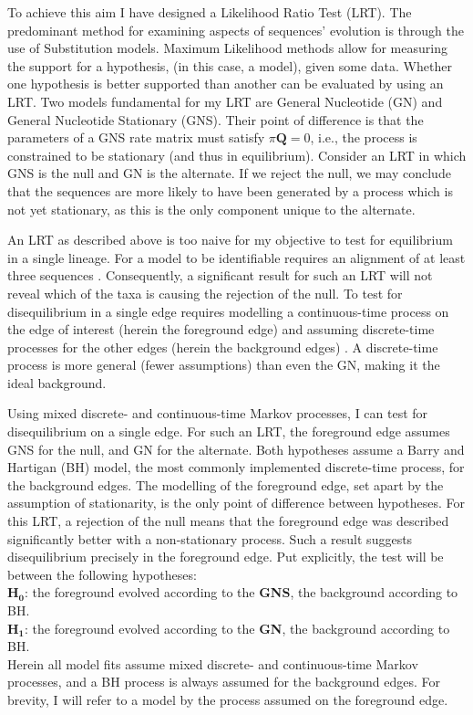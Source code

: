 To achieve this aim I have designed a Likelihood Ratio Test (LRT). The predominant method for examining aspects of sequences' evolution is through the use of \glspl{Substitution model}. \Gls{Maximum Likelihood} methods allow for measuring the support for a hypothesis, (in this case, a \gls{model}), given some data. Whether one hypothesis is better supported than another can be evaluated by using an LRT. Two models fundamental for my LRT are General Nucleotide (GN) and General Nucleotide Stationary (GNS). Their point of difference is that the parameters of a GNS rate matrix must satisfy $\pi\mathbf{Q}=0$, i.e., the process is constrained to be stationary (and thus in equilibrium). Consider an LRT in which GNS is the null and GN is the alternate. If we reject the null, we may conclude that the sequences are more likely to have been generated by a process which is not yet stationary, as this is the only component unique to the alternate.

An LRT as described above is too naive for my objective to test for equilibrium in a single lineage. For a model to be \gls{identifiable} requires an alignment of at least three sequences \cite{Chang1996FullConsistency}. Consequently, a significant result for such an LRT will not reveal which of the taxa is causing the rejection of the null. To test for disequilibrium in a single \gls{edge} requires  modelling a continuous-time process on the edge of interest (herein the foreground edge) and assuming discrete-time processes for the other edges (herein the background edges) \cite{Verbyla2013TheSubstitution}. A discrete-time process is more general (fewer assumptions) than even the GN, making it the ideal background. 

Using mixed discrete- and continuous-time Markov processes, I can test for disequilibrium on a single edge. For such an LRT, the foreground edge assumes GNS for the null, and GN for the alternate. Both hypotheses assume a Barry and Hartigan (BH) model, the most commonly implemented discrete-time process, for the background edges. The modelling of the foreground edge, set apart by the assumption of stationarity, is the only point of difference between hypotheses. For this LRT, a rejection of the null means that the foreground edge was described significantly better with a non-stationary process. Such a result suggests disequilibrium precisely in the foreground edge. Put explicitly, the test will be between the following hypotheses:\\ $\mathbf{H_0}$: the foreground evolved according to the \textbf{GNS}, the background according to BH. \\ $\mathbf{H_1}$: the foreground evolved according to the \textbf{GN}, the background according to BH.\\
\noindent Herein all model fits assume mixed discrete- and continuous-time Markov processes, and a BH process is always assumed for the background edges. For brevity, I will refer to a model by the process assumed on the foreground edge.


